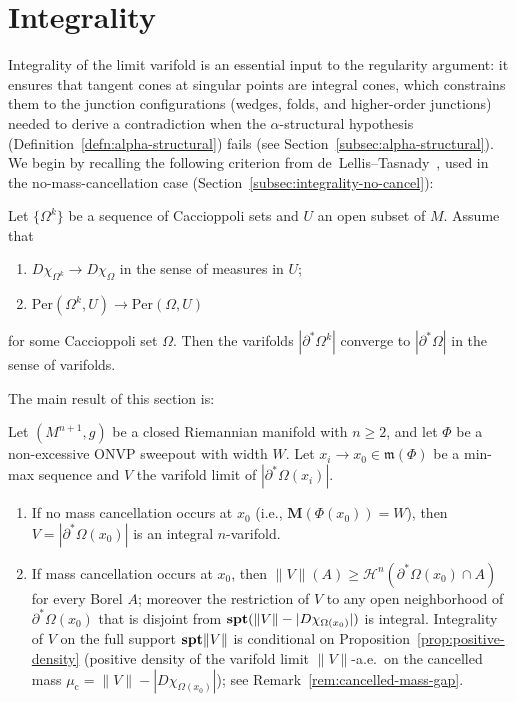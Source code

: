 
\section{Integrality}\label{sec:integrality}

Integrality of the limit varifold is an essential input to the regularity argument: it ensures that tangent cones at singular points are integral cones, which constrains them to the junction configurations (wedges, folds, and higher-order junctions) needed to derive a contradiction when the $\alpha$-structural hypothesis (Definition~\ref{defn:alpha-structural}) fails (see Section~\ref{subsec:alpha-structural}). We begin by recalling the following criterion from de~Lellis--Tasnady~\cite{DLT13}, used in the no-mass-cancellation case (Section~\ref{subsec:integrality-no-cancel}):

\begin{proposition}\label{prop:p2-DLT-integrality}
    Let $\{\Omega^k\}$ be a sequence of Caccioppoli sets and $U$ an open subset of $M$. Assume that
    \begin{enumerate}[label=\textup{(\roman*)}]
        \item $D\chi_{\Omega^k} \to D\chi_\Omega$ in the sense of measures in $U$;
        \item $\mathrm{Per}(\Omega^k, U) \to \mathrm{Per}(\Omega, U)$
    \end{enumerate}
    for some Caccioppoli set $\Omega$. Then the varifolds $|\partial^*\Omega^k|$ converge to $|\partial^*\Omega|$ in the sense of varifolds.
\end{proposition}

The main result of this section is:

\begin{theorem}\label{thm:integrality}
Let $(M^{n+1}, g)$ be a closed Riemannian manifold with $n \geq 2$, and let $\Phi$ be a non-excessive ONVP sweepout with width $W$. Let $x_i \to x_0 \in \mathfrak{m}(\Phi)$ be a min-max sequence and $V$ the varifold limit of $|\partial^*\Omega(x_i)|$.
\begin{enumerate}[label=\textup{(\alph*)}]
    \item If no mass cancellation occurs at $x_0$ (i.e., $\mathbf{M}(\Phi(x_0)) = W$), then $V = |\partial^*\Omega(x_0)|$ is an integral $n$-varifold.
    \item If mass cancellation occurs at $x_0$, then $\|V\|(A) \geq \mathcal{H}^n(\partial^*\Omega(x_0) \cap A)$ for every Borel $A$; moreover the restriction of $V$ to any open neighborhood of $\partial^*\Omega(x_0)$ that is disjoint from $\mathbf{spt}(\|V\| - |D\chi_{\Omega(x_0)}|)$ is integral. Integrality of $V$ on the full support $\mathbf{spt}\|V\|$ is conditional on Proposition~\ref{prop:positive-density} (positive density of the varifold limit $\|V\|$-a.e.\ on the cancelled mass $\mu_{\mathrm{c}} = \|V\| - |D\chi_{\Omega(x_0)}|$); see Remark~\ref{rem:cancelled-mass-gap}.
\end{enumerate}
\end{theorem}

